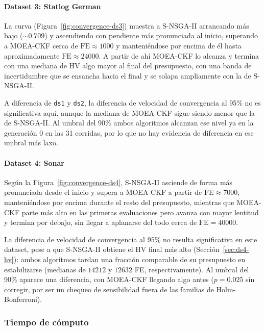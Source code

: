 \paragraph{Dataset 3: Statlog German}\label{sec:ds3-convergencia}

La curva (Figura~\ref{fig:convergence-ds3}) muestra a S-NSGA-II arrancando más bajo ($\sim0.709$) y ascendiendo con pendiente más pronunciada al inicio, superando a MOEA-CKF cerca de $\text{FE}\approx1000$ y manteniéndose por encima de él hasta aproximadamente $\text{FE}\approx24000$. A partir de ahí MOEA-CKF lo alcanza y termina con una mediana de HV algo mayor al final del presupuesto, con una banda de incertidumbre que se ensancha hacia el final y se solapa ampliamente con la de S-NSGA-II.

A diferencia de \texttt{ds1} y \texttt{ds2}, la diferencia de velocidad de convergencia al 95\% no es significativa aquí, aunque la mediana de MOEA-CKF sigue siendo menor que la de S-NSGA-II. Al umbral del 90\% ambos algoritmos alcanzan ese nivel ya en la generación 0 en las 31 corridas, por lo que no hay evidencia de diferencia en ese umbral más laxo.

\paragraph{Dataset 4: Sonar}\label{sec:ds4-convergencia}

Según la Figura~\ref{fig:convergence-ds4}, S-NSGA-II asciende de forma más pronunciada desde el inicio y supera a MOEA-CKF a partir de $\text{FE}\approx7000$, manteniéndose por encima durante el resto del presupuesto, mientras que MOEA-CKF parte más alto en las primeras evaluaciones pero avanza con mayor lentitud y termina por debajo, sin llegar a aplanarse del todo cerca de $\text{FE}=40000$.

La diferencia de velocidad de convergencia al 95\% no resulta significativa en este dataset, pese a que S-NSGA-II obtiene el HV final más alto (Sección~\ref{sec:ds4-hv}): ambos algoritmos tardan una fracción comparable de su presupuesto en estabilizarse (medianas de $14212$ y $12632$ FE, respectivamente). Al umbral del 90\% aparece una diferencia, con MOEA-CKF llegando algo antes ($p=0.025$ sin corregir, por ser un chequeo de sensibilidad fuera de las familias de Holm-Bonferroni).

\subsubsection{Tiempo de cómputo}\label{sec:tiempo-referencia}

